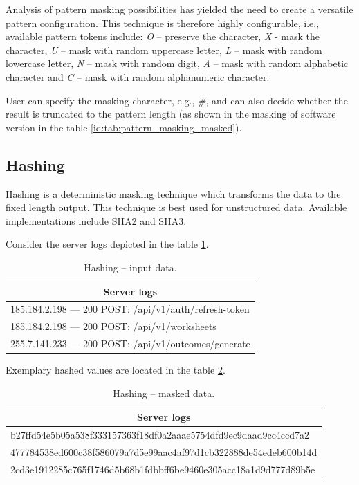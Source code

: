\documentclass[a4paper,twoside,12pt]{book}
\begin{document}
Analysis of pattern masking possibilities has yielded the need to create a versatile pattern configuration. This technique is therefore highly configurable, i.e., available pattern tokens include: \textit{O} – preserve the character, \textit{X} - mask the character, \textit{U} – mask with random uppercase letter, \textit{L} – mask with random lowercase letter, \textit{N} – mask with random digit, \textit{A} – mask with random alphabetic character and \textit{C} – mask with random alphanumeric character.

User can specify the masking character, e.g., \textit{\#}, and can also decide whether the result is truncated to the pattern length (as shown in the masking of software version in the table \ref{id:tab:pattern_masking_masked}).

\subsection{Hashing}

Hashing is a deterministic masking technique \cite{bib:anonymization_for_research} which transforms the data to the fixed length output. This technique is best used for unstructured data. Available implementations include SHA2 and SHA3.

Consider the server logs depicted in the table \ref{id:tab:hashing_raw}.

\begin{table}[h]
\centering
\caption{Hashing – input data.}
\label{id:tab:hashing_raw}
\begin{tabular}{l}
\toprule
\multicolumn{1}{c}{Server logs} \\ \midrule
185.184.2.198 — 200 POST: /api/v1/auth/refresh-token    \\
185.184.2.198 — 200 POST: /api/v1/worksheets \\
255.7.141.233 — 200 POST: /api/v1/outcomes/generate \\ \bottomrule
\end{tabular}
\end{table}

Exemplary hashed values are located in the table \ref{id:tab:hashing_masked}.

\begin{table}[h]
\centering
\caption{Hashing – masked data.}
\label{id:tab:hashing_masked}
\begin{tabular}{l}
\toprule
\multicolumn{1}{c}{Server logs} \\ \midrule
b27ffd54e5b05a538f333157363f18df0a2aaae5754dfd9ec9daad9cc4ccd7a2 \\
477784538ed600c38f586079a7d5e99aac4af97d1cb322888de54edeb600b14d \\
2cd3e1912285c765f1746d5b68b1fdbbff6be9460e305acc18a1d9d777d89b5e \\ \bottomrule
\end{tabular}
\end{table}
\end{document}
